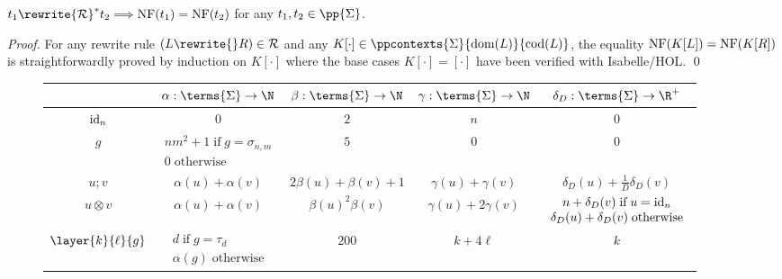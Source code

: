 \begin{lemma}\label{lem:nfispreserved}
    $t_1\rewrite{\mathcal{R}}^* t_2{\implies}\textup{NF}(t_1)=\textup{NF}(t_2)$ for any $t_1,t_2\in\pp{\Sigma}$.
\end{lemma}
\begin{proof}
    For any rewrite rule $(L\rewrite{}R)\in\mathcal{R}$ and any $K[\cdot]\in\ppcontexts{\Sigma}{\textup{dom}(L)}{\textup{cod}(L)}$, the equality $\textup{NF}(K[L])=\textup{NF}(K[R])$ is straightforwardly proved by induction on $K[\cdot]$ where the base cases $K[\cdot]=[\cdot]$ have been verified with Isabelle/HOL. \qed
\end{proof}


\begin{figure}[t]
    \begin{center}
        \setlength{\tabcolsep}{2.4pt}
        \begin{tabular}{|c|c|c|c|c|}
            \hline
            & $\alpha:\terms{\Sigma}\to\N$ & $\beta:\terms{\Sigma}\to\N$ & $\gamma:\terms{\Sigma}\to\N$ & $\delta_D:\terms{\Sigma}\to\R^+$ \\
            \hline
            $\textup{id}_n$ & $0$ & $2$ & $n$ & $0$ \\
            \hline
            $g$ & $\begin{array}{c}
                nm^2{+}1 \;\text{if}\; g=\sigma_{n,m}\\
                0 \;\text{otherwise}
            \end{array}$ & $5$ & $0$ & $0$ \\
            \hline
            $u\semicolon v$ & $\alpha(u)+\alpha(v)$ & $2\beta(u)+\beta(v)+1$ & $\gamma(u)+\gamma(v)$ & $\delta_D(u)+\frac{1}{D}\delta_D(v)$ \\ 
            \hline
            $u\otimes v$ & $\alpha(u)+\alpha(v)$ & $\beta(u)^2\beta(v)$ & $\gamma(u)+2\gamma(v)$ & $\begin{array}{c}
                n+\delta_D(v) \;\text{if}\; u=\textup{id}_n\\
                \delta_D(u)+\delta_D(v) \;\text{otherwise}
            \end{array}$\\
            \hline
            \hline
            $\layer{k}{\ell}{g}$ & $\begin{array}{c}
                d \;\text{if}\; g=\tau_d\\
                \alpha(g) \;\text{otherwise}
            \end{array}$ & $200$ & $k+4\ell$ & $k$ \\
            \hline
        \end{tabular}


\end{center}
\end{figure}
